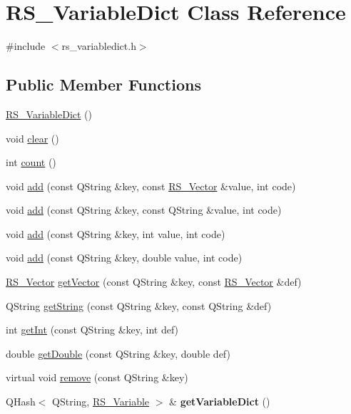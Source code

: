 \hypertarget{classRS__VariableDict}{\section{R\-S\-\_\-\-Variable\-Dict Class Reference}
\label{classRS__VariableDict}
}


{\ttfamily \#include $<$rs\-\_\-variabledict.\-h$>$}

\subsection*{Public Member Functions}
\begin{DoxyCompactItemize}
\item 
\hyperlink{classRS__VariableDict_a62bc76de428630af285f2da279998ae7}{R\-S\-\_\-\-Variable\-Dict} ()
\item 
void \hyperlink{classRS__VariableDict_a60d1f5999d3bd1ae867586c1bd7a562c}{clear} ()
\item 
int \hyperlink{classRS__VariableDict_a6dcc527f5432f7509abfa800293e4231}{count} ()
\item 
void \hyperlink{classRS__VariableDict_a0a9905fba1e3349dd70834d7f8fc0524}{add} (const Q\-String \&key, const \hyperlink{classRS__Vector}{R\-S\-\_\-\-Vector} \&value, int code)
\item 
void \hyperlink{classRS__VariableDict_a571efcb90903aade2f846f770bd2d555}{add} (const Q\-String \&key, const Q\-String \&value, int code)
\item 
void \hyperlink{classRS__VariableDict_a30d49492775d2b5a33a92c4f1d443579}{add} (const Q\-String \&key, int value, int code)
\item 
void \hyperlink{classRS__VariableDict_a4f07f21f7ce9e45b699d3be939077f75}{add} (const Q\-String \&key, double value, int code)
\item 
\hyperlink{classRS__Vector}{R\-S\-\_\-\-Vector} \hyperlink{classRS__VariableDict_aa18a7e6c2df5d908900233e12ee7f732}{get\-Vector} (const Q\-String \&key, const \hyperlink{classRS__Vector}{R\-S\-\_\-\-Vector} \&def)
\item 
Q\-String \hyperlink{classRS__VariableDict_afbdefa3c33e5ec27d26c76454df4acb7}{get\-String} (const Q\-String \&key, const Q\-String \&def)
\item 
int \hyperlink{classRS__VariableDict_af40be0bf9aec8128eeb85c2d632f2a8e}{get\-Int} (const Q\-String \&key, int def)
\item 
double \hyperlink{classRS__VariableDict_ac32fa71577bd4152bcfb841db4264ebe}{get\-Double} (const Q\-String \&key, double def)
\item 
virtual void \hyperlink{classRS__VariableDict_a037461b82e97d3c8d3fc3e60ad7855cb}{remove} (const Q\-String \&key)
\item 
\hypertarget{classRS__VariableDict_afc34ca3a593a233371db141c9fccecb0}{Q\-Hash$<$ Q\-String, \hyperlink{classRS__Variable}{R\-S\-\_\-\-Variable} $>$ \& {\bfseries get\-Variable\-Dict} ()}\label{classRS__VariableDict_afc34ca3a593a233371db141c9fccecb0}

\end{DoxyCompactItemize}
